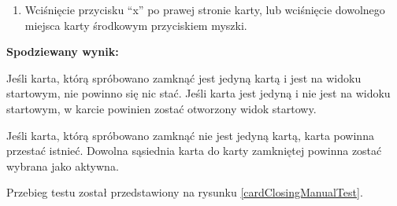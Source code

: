 \begin{enumerate}
\begin{enumerate}
\begin{enumerate}
                    \item Wciśnięcie przycisku ``x'' po prawej stronie karty,
                        lub wciśnięcie dowolnego miejsca karty środkowym
                        przyciskiem myszki.

                \end{enumerate}

                \textbf{Spodziewany wynik:}

                Jeśli karta, którą spróbowano zamknąć jest jedyną kartą i
                jest na widoku startowym, nie powinno się nic stać. Jeśli karta
                jest jedyną i nie jest na widoku startowym, w karcie powinien
                zostać otworzony widok startowy.

                Jeśli karta, którą spróbowano zamknąć nie jest jedyną kartą,
                karta powinna przestać istnieć. Dowolna sąsiednia karta do karty
                zamkniętej powinna zostać wybrana jako aktywna.

                Przebieg testu został przedstawiony na rysunku \ref{cardClosingManualTest}.

                \begin{figure}[h]
                    \centering





\end{figure}
\end{enumerate}
\end{enumerate}
